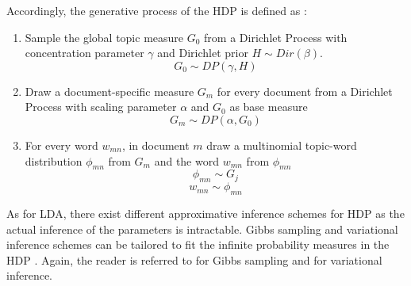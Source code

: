 Accordingly, the generative process of the HDP is defined as \cite{Teh04hierarchicaldirichlet,DBLP:phd/dnb/Kling16}:
\begin{enumerate}
\item Sample the global topic measure $G_0$ from a Dirichlet Process with concentration parameter $\gamma$ and Dirichlet prior $H \sim Dir(\beta)$.
\begin{equation}
G_0 \sim DP(\gamma,H)
\end{equation}
\item Draw a document-specific measure $G_m$ for every document from a Dirichlet Process with scaling parameter $\alpha$ and $G_0$ as base measure
\begin{equation}
G_m \sim DP(\alpha,G_0)
\end{equation}
\item For every word $w_{mn}$, in document $m$ draw a multinomial topic-word distribution $\phi_{mn}$ from $G_m$ and the word $w_{mn}$ from $\phi_{mn}$
\begin{equation}
\phi_{mn} \sim G_j
\end{equation}
\begin{equation}
w_{mn} \sim \phi_{mn}
\end{equation}
\end{enumerate}

As for LDA, there exist different approximative inference schemes for HDP as the actual inference of the parameters is intractable. Gibbs sampling and variational inference schemes can be tailored to fit the infinite probability measures in the HDP \cite{DBLP:phd/dnb/Kling16}. Again, the reader is referred to \cite{Teh04hierarchicaldirichlet,DBLP:phd/dnb/Kling16} for Gibbs sampling and \cite{DBLP:phd/dnb/Kling16} for variational inference.

